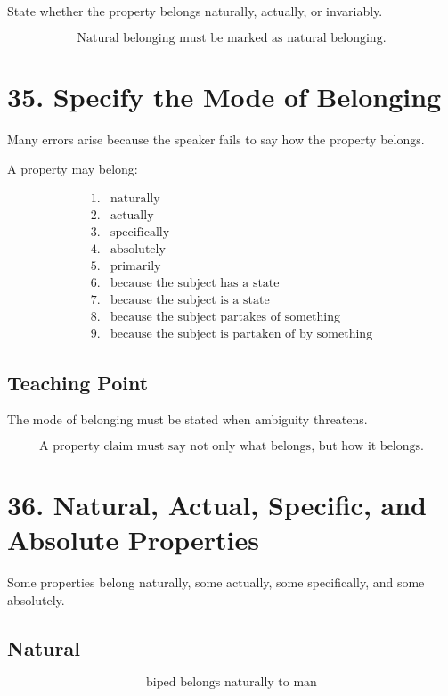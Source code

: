 \documentclass[12pt]{article}
\begin{document}
State whether the property belongs naturally, actually, or invariably.

\[
\boxed{
\text{Natural belonging must be marked as natural belonging.}
}
\]

\section*{35. Specify the Mode of Belonging}

Many errors arise because the speaker fails to say how the property belongs.

A property may belong:

\[
\begin{array}{ll}
1. & \text{naturally} \\
2. & \text{actually} \\
3. & \text{specifically} \\
4. & \text{absolutely} \\
5. & \text{primarily} \\
6. & \text{because the subject has a state} \\
7. & \text{because the subject is a state} \\
8. & \text{because the subject partakes of something} \\
9. & \text{because the subject is partaken of by something}
\end{array}
\]

\subsection*{Teaching Point}

The mode of belonging must be stated when ambiguity threatens.

\[
\boxed{
\text{A property claim must say not only what belongs, but how it belongs.}
}
\]

\section*{36. Natural, Actual, Specific, and Absolute Properties}

Some properties belong naturally, some actually, some specifically, and some
absolutely.

\subsection*{Natural}

\[
\text{biped belongs naturally to man}
\]
\end{document}
